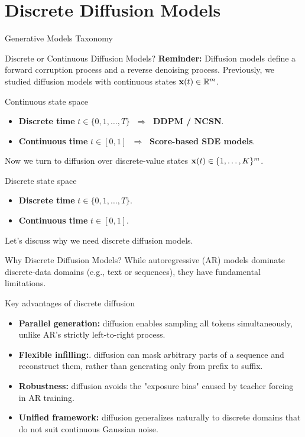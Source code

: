 \documentclass{beamer}
\renewcommand{\eqpause}{}
\begin{document}
\section{Discrete Diffusion Models}
\begin{frame}{Generative Models Taxonomy}
\end{frame}
\begin{frame}{Discrete or Continuous Diffusion Models?}
	\textbf{Reminder:} Diffusion models define a forward corruption process and a reverse denoising process.
	Previously, we studied diffusion models with continuous states $\mathbf{x}(t) \in \mathbb{R}^m$.
	\begin{block}{Continuous state space}
		\begin{itemize}
			\item \textbf{Discrete time} $t \in \{0,1,\ldots,T\}$ $\;\Rightarrow\;$ \textbf{DDPM / NCSN}.
			\item \textbf{Continuous time} $t \in [0,1]$ $\;\Rightarrow\;$ \textbf{Score-based SDE models}.
		\end{itemize}
	\end{block}
	\eqpause
	Now we turn to diffusion over discrete-value states $\mathbf{x}(t) \in \{1, \dots, K\}^m$.
	\begin{block}{Discrete state space}
		\begin{itemize}
			\item \textbf{Discrete time} $t \in \{0,1,\ldots,T\}$.
			\item \textbf{Continuous time} $t \in [0,1]$.
		\end{itemize}
	\end{block}
	Let's discuss why we need discrete diffusion models.
\end{frame}
\begin{frame}{Why Discrete Diffusion Models?}
	While autoregressive (AR) models dominate discrete-data domains (e.g., text or sequences), they have fundamental limitations.
	\eqpause
	\begin{block}{Key advantages of discrete diffusion}
		\begin{itemize}
			\item \textbf{Parallel generation:} diffusion enables sampling all tokens simultaneously, unlike AR’s strictly left-to-right process. 
			\eqpause
			\item \textbf{Flexible infilling:}. diffusion can mask arbitrary parts of a sequence and reconstruct them, rather than generating only from prefix to suffix.
			\eqpause 
			\item \textbf{Robustness:} diffusion avoids the "exposure bias" caused by teacher forcing in AR training.
			\eqpause
			\item \textbf{Unified framework:} diffusion generalizes naturally to discrete domains that do not suit continuous Gaussian noise.
		\end{itemize}
	\end{block}
\end{frame}
\end{document}
